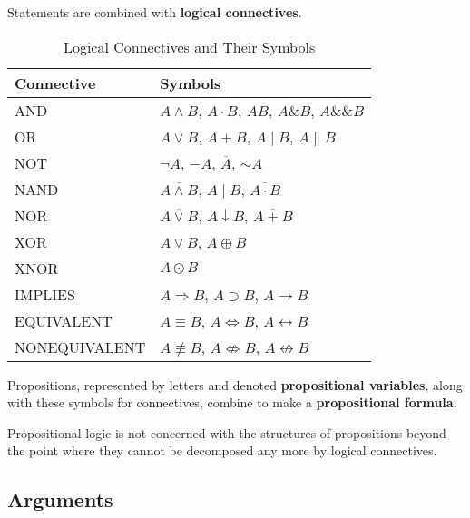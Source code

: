   \begin{definition}[Connectives]
    Statements are combined with \textbf{logical connectives}. 
    \begin{table}[H]
      \centering
      \begin{tabular}{|l|l|}
      \hline
      \textbf{Connective} & \textbf{Symbols} \\
      \hline
      AND & $A \wedge B$, $A \cdot B$, $AB$, $A \& B$, $A \&\& B$ \\
      \hline
      OR & $A \vee B$, $A + B$, $A \mid B$, $A \parallel B$ \\
      \hline
      NOT & $\neg A$, $-A$, $\overline{A}$, $\sim A$ \\
      \hline
      NAND & $\overline{A \wedge B}$, $A \mid B$, $\overline{A \cdot B}$ \\
      \hline
      NOR & $\overline{A \vee B}$, $A \downarrow B$, $\overline{A + B}$ \\
      \hline
      XOR & $A \veebar B$, $A \oplus B$ \\
      \hline
      XNOR & $A \odot B$ \\
      \hline
      IMPLIES & $A \Rightarrow B$, $A \supset B$, $A \rightarrow B$ \\
      \hline
      EQUIVALENT & $A \equiv B$, $A \Leftrightarrow B$, $A \leftrightarrow B$ \\
      \hline
      NONEQUIVALENT & $A \not\equiv B$, $A \not\Leftrightarrow B$, $A \not\leftrightarrow B$ \\
      \hline
      \end{tabular}
      \caption{Logical Connectives and Their Symbols}
      \label{tab:logical-connectives}
    \end{table} 
  \end{definition} 

  \begin{definition}
    Propositions, represented by letters and denoted \textbf{propositional variables}, along with these symbols for connectives, combine to make a \textbf{propositional formula}. 
  \end{definition}

  Propositional logic is not concerned with the structures of propositions beyond the point where they cannot be decomposed any more by logical connectives. 

\subsection{Arguments}

